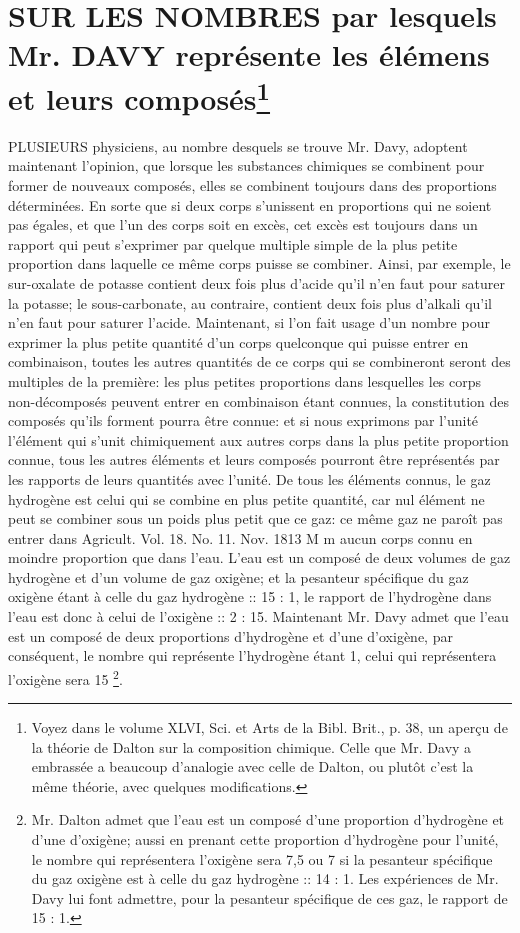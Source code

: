 \setcounter{page}{450}
\section{SUR LES NOMBRES par lesquels Mr. DAVY représente les élémens et leurs composés\footnote{Voyez dans le volume XLVI, Sci. et Arts de la Bibl. Brit., p. 38, un aperçu de la théorie de Dalton sur la composition chimique. Celle que Mr. Davy a embrassée a beaucoup d'analogie avec celle de Dalton, ou plutôt c'est la même théorie, avec quelques modifications.}}
PLUSIEURS physiciens, au nombre desquels se trouve Mr. Davy, adoptent maintenant l'opinion, que lorsque les substances chimiques se combinent pour former de nouveaux composés, elles se combinent toujours dans des proportions déterminées. En sorte que si deux corps s'unissent en proportions qui ne soient pas égales, et que l'un des corps soit en excès, cet excès est toujours dans un rapport qui peut s'exprimer\setcounter{page}{451} par quelque multiple simple de la plus petite proportion dans laquelle ce même corps puisse se combiner. Ainsi, par exemple, le sur-oxalate de potasse contient deux fois plus d'acide qu'il n'en faut pour saturer la potasse; le sous-carbonate, au contraire, contient deux fois plus d'alkali qu'il n'en faut pour saturer l'acide.
Maintenant, si l'on fait usage d'un nombre pour exprimer la plus petite quantité d'un corps quelconque qui puisse entrer en combinaison, toutes les autres quantités de ce corps qui se combineront seront des multiples de la première: les plus petites proportions dans lesquelles les corps non-décomposés peuvent entrer en combinaison étant connues, la constitution des composés qu'ils forment pourra être connue: et si nous exprimons par l'unité l'élément qui s'unit chimiquement aux autres corps dans la plus petite proportion connue, tous les autres éléments et leurs composés pourront être représentés par les rapports de leurs quantités avec l'unité.
De tous les éléments connus, le gaz hydrogène est celui qui se combine en plus petite quantité, car nul élément ne peut se combiner sous un poids plus petit que ce gaz: ce même gaz ne paroît pas entrer dans
Agricult. Vol. 18. No. 11. Nov. 1813 M m\setcounter{page}{452} aucun corps connu en moindre proportion que dans l'eau. L'eau est un composé de deux volumes de gaz hydrogène et d'un volume de gaz oxigène; et la pesanteur spécifique du gaz oxigène étant à celle du gaz hydrogène :: 15 : 1, le rapport de l'hydrogène dans l'eau est donc à celui de l'oxigène :: 2 : 15. Maintenant Mr. Davy admet que l'eau est un composé de deux proportions d'hydrogène et d'une d'oxigène, par conséquent, le nombre qui représente l'hydrogène étant 1, celui qui représentera l'oxigène sera 15 \footnote{Mr. Dalton admet que l'eau est un composé d'une proportion d'hydrogène et d'une d'oxigène; aussi en prenant cette proportion d'hydrogène pour l'unité, le nombre qui représentera l'oxigène sera 7,5 ou 7 si la pesanteur spécifique du gaz oxigène est à celle du gaz hydrogène :: 14 : 1. Les expériences de Mr. Davy lui font admettre, pour la pesanteur spécifique de ces gaz, le rapport de 15 : 1.}.
